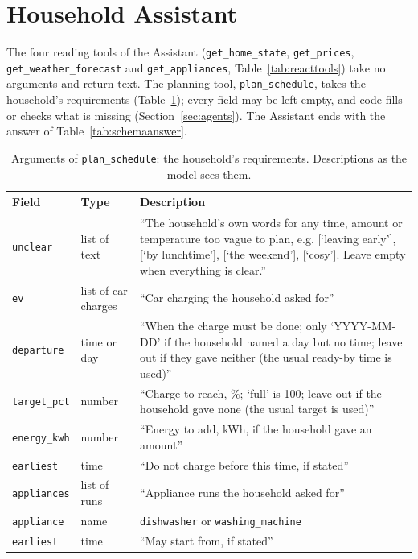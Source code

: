 \section{Household Assistant}

The four reading tools of the Assistant (\texttt{get\_home\_state}, \texttt{get\_prices},
\texttt{get\_weather\_\allowbreak forecast} and \texttt{get\_appliances},
Table~\ref{tab:reacttools}) take no
arguments and return text. The planning tool, \texttt{plan\_schedule},
takes the household's requirements (Table~\ref{tab:schemareq}); every
field may be left empty, and code fills or checks what is missing
(Section~\ref{sec:agents}). The Assistant ends with the answer of
Table~\ref{tab:schemaanswer}.

\begin{table}[htbp]
\caption{Arguments of \texttt{plan\_schedule}: the household's
requirements. Descriptions as the model sees them.}
\label{tab:schemareq}
\small
\begin{tabularx}{\textwidth}{@{}>{\raggedright\arraybackslash}p{3.3cm}>{\raggedright\arraybackslash}p{2.4cm}X@{}}
\toprule
Field & Type & Description \\
\midrule
\texttt{unclear} & list of text & ``The household's own words for any time, amount or temperature too vague to plan, e.g. [`leaving early'], [`by lunchtime'], [`the weekend'], [`cosy']. Leave empty when everything is clear.'' \\
\texttt{ev} & list of car charges & ``Car charging the household asked for'' \\
\quad\texttt{departure} & time or day & ``When the charge must be done; only `YYYY-MM-DD' if the household named a day but no time; leave out if they gave neither (the usual ready-by time is used)'' \\
\quad\texttt{target\_pct} & number & ``Charge to reach, \%; `full' is 100; leave out if the household gave none (the usual target is used)'' \\
\quad\texttt{energy\_kwh} & number & ``Energy to add, kWh, if the household gave an amount'' \\
\quad\texttt{earliest} & time & ``Do not charge before this time, if stated'' \\
\texttt{appliances} & list of runs & ``Appliance runs the household asked for'' \\
\quad\texttt{appliance} & name & \texttt{dishwasher} or \texttt{washing\_machine} \\
\quad\texttt{earliest} & time & ``May start from, if stated'' \\

\end{tabularx}
\end{table}
